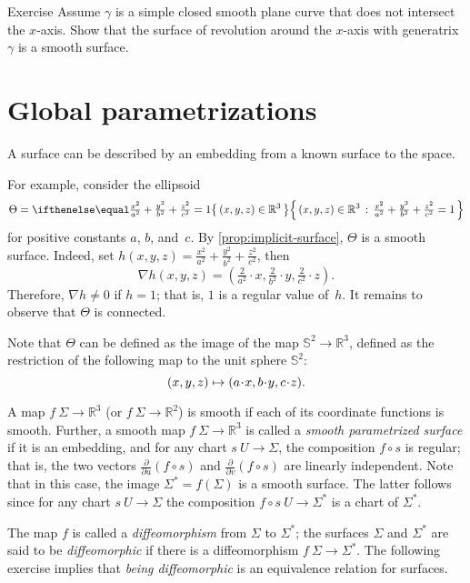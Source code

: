 \begin{thm}{Exercise}\label{ex:revolution}
Assume $\gamma$ is a simple closed smooth plane curve that does not intersect the $x$-axis.
Show that the surface of revolution around the $x$-axis with generatrix $\gamma$ is a smooth surface.
\end{thm}


\section{Global parametrizations}\label{sec:global-parametrizations}

A surface can be described by an embedding from a known surface to the space.

For example, consider the ellipsoid
\[\Theta=\set{(x,y,z)\in\mathbb{R}^3}{\tfrac{x^2}{a^2}+\tfrac{y^2}{b^2}+\tfrac{z^2}{c^2}=1}\]
for positive constants $a$, $b$, and~$c$.
By \ref{prop:implicit-surface}, $\Theta$ is a smooth surface.
Indeed, set $h(x,y,z)=\tfrac{x^2}{a^2}+\tfrac{y^2}{b^2}+\tfrac{z^2}{c^2}$,
then
\[\nabla h(x,y,z)=(\tfrac{2}{a^2}\cdot x,\tfrac{2}{b^2}\cdot y,\tfrac{2}{c^2}\cdot z).\]
Therefore, $\nabla h\ne0$ if $h=1$; that is, $1$ is a regular value of~$h$.
It remains to observe that $\Theta$ is connected.

Note that $\Theta$ can be defined as the image of the map $ \mathbb{S}^2\to\mathbb{R}^3$, defined as the restriction of the following map to the unit sphere $\mathbb{S}^2$:
\[(x,y,z)\z\mapsto (a\cdot x, b\cdot y,c\cdot z).\]


A map $f\:\Sigma \to \mathbb{R}^3$ (or $f\:\Sigma \to \mathbb{R}^2$) is smooth if each of its coordinate functions is smooth.
Further, a smooth map $f \: \Sigma \to \mathbb{R}^3$ is called a 
\emph{smooth parametrized surface} if it is an embedding, and for any chart $s \:U\to \Sigma$,
the composition $f\circ s$ is regular;
that is,  the two vectors 
$\frac{\partial}{\partial u}(f\circ s)$ and $\frac{\partial}{\partial v}(f\circ s)$ are linearly independent.
Note that in this case, the image $\Sigma^{*}=f(\Sigma)$ is a smooth surface.
The latter follows since for any chart $s\:U\to \Sigma$ the composition $f\circ s\:U\to \Sigma^{*}$ is a chart of $\Sigma^{*}$. 

The map $f$ is called a \emph{diffeomorphism} from $\Sigma$ to $\Sigma^{*}$;
the surfaces $\Sigma$ and $\Sigma^{*}$ are said to be {}\emph{diffeomorphic} if there is a diffeomorphism $f\:\Sigma\to\Sigma^{*}$.
The following exercise implies that \textit{being diffeomorphic} is an equivalence relation for surfaces.


